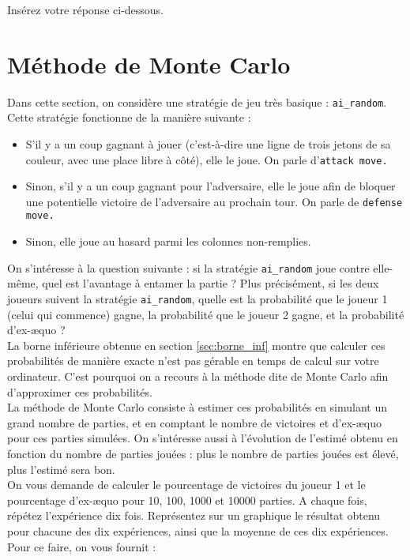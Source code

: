 \documentclass[11pt,answers]{exam}
\begin{document}
\begin{solutionbox}{120mm}
Insérez votre réponse ci-dessous.


\end{solutionbox}

\newpage

\section{Méthode de Monte Carlo}

Dans cette section, on considère une stratégie de jeu très basique : \texttt{ai\_random}. Cette stratégie fonctionne de la manière suivante :
\begin{itemize}
    \item S'il y a un coup gagnant à jouer (c'est-à-dire une ligne de trois jetons de sa couleur, avec une place libre à côté), elle le joue. On parle d'\texttt{attack move.}
    \item Sinon, s'il y a un coup gagnant pour l'adversaire, elle le joue afin de bloquer une potentielle victoire de l'adversaire au prochain tour. On parle de \texttt{defense move.}
    \item Sinon, elle joue au hasard parmi les colonnes non-remplies.
\end{itemize}

On s'intéresse à la question suivante : si la stratégie \texttt{ai\_random} joue contre elle-même, quel est l'avantage à entamer la partie ? Plus précisément, si les deux joueurs suivent la stratégie \texttt{ai\_random}, quelle est la probabilité que le joueur 1 (celui qui commence) gagne, la probabilité que le joueur 2 gagne, et la probabilité d'ex-æquo ?\\

La borne inférieure obtenue en section \ref{sec:borne_inf} montre que calculer ces probabilités de manière exacte n'est pas gérable en temps de calcul sur votre ordinateur. C'est pourquoi on a recours à la méthode dite de Monte Carlo afin d'approximer ces probabilités.\\

La méthode de Monte Carlo consiste à estimer ces probabilités en simulant un grand nombre de parties, et en comptant le nombre de victoires et d'ex-æquo pour ces parties simulées. On s'intéresse aussi à l'évolution de l'estimé obtenu en fonction du nombre de parties jouées : plus le nombre de parties jouées est élevé, plus l'estimé sera bon.\\

On vous demande de calculer le pourcentage de victoires du joueur 1 et le pourcentage d'ex-æquo pour 10, 100, 1000 et 10000 parties. A chaque fois, répétez l'expérience dix fois. Représentez sur un graphique le résultat obtenu pour chacune des dix expériences, ainsi que la moyenne de ces dix expériences. Pour ce faire, on vous fournit :
\end{document}
